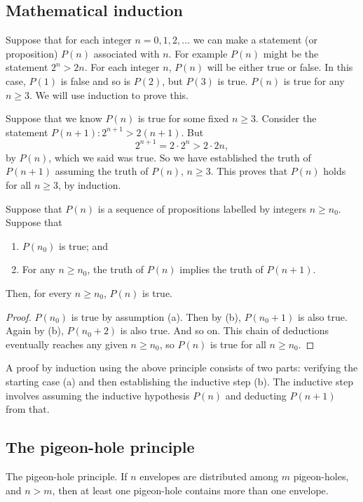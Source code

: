 \documentclass[10pt, a4paper]{article}
\begin{document}
\subsection{Mathematical induction}
Suppose that for each integer $n = 0, 1, 2, \dotsc$ we can make a statement (or proposition) $P(n)$ associated with $n$.
For example $P(n)$ might be the statement $2 ^ n > 2n$.
For each integer $n$,
$P(n)$ will be either true or false.
In this case, $P(1)$ is false and so is $P(2)$,
but $P(3)$ is true.
$P(n)$ is true for any $n \geq 3$.
We will use induction to prove this.

Suppose that we know $P(n)$ is true for some fixed $n \geq 3$.
Consider the statement $P(n + 1) : 2 ^ {n + 1} > 2(n + 1)$.
But
\[
2 ^ {n + 1} = 2 \cdot 2 ^ n > 2 \cdot 2n,
\]
by $P(n)$, which we said was true.
So we have established the truth of $P(n + 1)$ assuming the truth of $P(n)$,
$n \geq 3$.
This proves that $P(n)$ holds for all $n \geq 3$,
by induction.

\begin{theorem}
    Suppose that $P(n)$ is a sequence of propositions labelled by integers $n \geq n_0$.
    Suppose that
    \begin{enumerate}[label = (\alph*)]
        \item $P(n_0)$ is true; and
        \item For any $n \geq n_0$, the truth of $P(n)$ implies the truth of $P(n + 1)$.
    \end{enumerate}
    Then, for every $n \geq n_0$,
    $P(n)$ is true.
    \begin{proof}
        $P(n_0)$ is true by assumption (a).
        Then by (b),
        $P(n_0 + 1)$ is also true.
        Again by (b),
        $P(n_0 + 2)$ is also true.
        And so on.
        This chain of deductions eventually reaches any given $n \geq n_0$,
        so $P(n)$ is true for all $n \geq n_0$.
    \end{proof}
\end{theorem}

A proof by induction using the above principle consists of two parts:
verifying the starting case (a) and then establishing the inductive step (b).
The inductive step involves assuming the inductive hypothesis $P(n)$ and deducting $P(n + 1)$ from that.

\subsection{The pigeon-hole principle}
The pigeon-hole principle.
If $n$ envelopes are distributed among $m$ pigeon-holes,
and $n > m$,
then at least one pigeon-hole contains more than one envelope.
\end{document}
